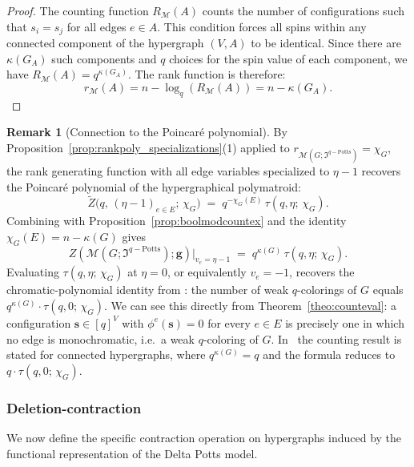 \documentclass[11pt,reqno]{amsart}
\newcommand{\vecs}{\boldsymbol{s}}
\newcommand{\vecg}{\boldsymbol{g}}
\newcommand{\Mo}{\mathcal{M}}
\newcommand{\mcp}{\mathfrak{I}^{q-\mathrm{Potts}}}
\theoremstyle{plain}
\theoremstyle{definition}
\newtheorem{remark}[theorem]{Remark}
\numberwithin{equation}{section}
\begin{document}
\begin{proof}
    The counting function $R_{\Mo}(A)$ counts the number of configurations such that $s_i = s_j$ for all edges $e \in A$. This condition forces all spins within any connected component of the hypergraph $(V, A)$ to be identical. Since there are $\kappa(G_A)$ such components and $q$ choices for the spin value of each component, we have $R_{\Mo}(A) = q^{\kappa(G_A)}$.
    The rank function is therefore:
    \[ r_{\Mo}(A) = n - \log_q(R_{\Mo}(A)) = n - \kappa(G_A). \]
\end{proof}

\begin{remark}[Connection to the Poincar\'e polynomial]
\label{rem:delta_potts_poincare}
By Proposition~\ref{prop:rankpoly_specializations}(1) applied to $r_{\Mo(G; \mcp)} = \chi_G$, the rank generating function with all edge variables specialized to $\eta - 1$ recovers the Poincar\'e polynomial of the hypergraphical polymatroid:
\[
    \widetilde Z\bigl(q,\, (\eta - 1)_{e \in E};\, \chi_G\bigr)
    \;=\;
    q^{-\chi_G(E)} \, \tau(q, \eta;\, \chi_G).
\]
Combining with Proposition~\ref{prop:boolmodcountex} and the identity $\chi_G(E) = n - \kappa(G)$ gives
\[
    Z(\Mo(G; \mcp); \vecg)\big|_{v_e = \eta - 1}
    \;=\;
    q^{\kappa(G)} \, \tau(q, \eta;\, \chi_G).
\]
Evaluating $\tau(q, \eta;\, \chi_G)$ at $\eta = 0$, or equivalently $v_e =-1$, recovers the chromatic-polynomial identity from \cite[Theorem~3.14]{Helg}: the number of weak $q$-colorings of $G$ equals $q^{\kappa(G)} \cdot \tau(q, 0;\, \chi_G)$. We can see this directly from Theorem~\ref{theo:counteval}: a configuration $\vecs \in [q]^V$ with $\phi^e(\vecs) = 0$ for every $e \in E$ is precisely one in which no edge is monochromatic, i.e.\ a weak $q$-coloring of $G$. In~\cite{Helg} the counting result is stated for connected hypergraphs, where $q^{\kappa(G)} = q$ and the formula reduces to $q \cdot \tau(q,0;\, \chi_G)$.
\end{remark}

\subsubsection{Deletion-contraction}

We now define the specific contraction operation on hypergraphs induced by the functional representation of the Delta Potts model.
\end{document}

